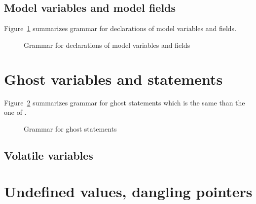 
\subsection{Model variables and model fields}

\nodiff

Figure~\ref{fig:gram:model} summarizes grammar for declarations of model
variables and fields.
\begin{figure}[htbp]
  \caption{Grammar for declarations of model variables and fields}
\label{fig:gram:model}
\end{figure}


\section{Ghost variables and statements}
\label{sec:ghost}


Figure~\ref{fig:gram:ghost} summarizes grammar for ghost statements which is the
same than the one of \acsl.
\begin{figure}[htbp]
  \caption{Grammar for ghost statements}
\label{fig:gram:ghost}
\end{figure}



\subsection{Volatile variables}
\absent


\section{Undefined values, dangling pointers}
\absent
